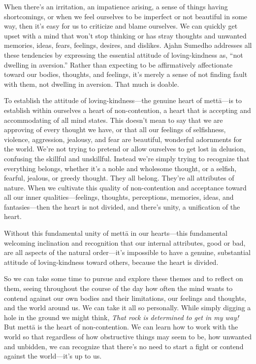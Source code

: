When there's an irritation, an impatience arising, a sense of things 
having shortcomings, or when we feel ourselves to be imperfect or not 
beautiful in some way, then it's easy for us to criticize and blame 
ourselves. We can quickly get upset with a mind that won't stop 
thinking or has stray thoughts and unwanted memories, ideas, fears, 
feelings, desires, and dislikes. Ajahn Sumedho addresses all these 
tendencies by expressing the essential attitude of loving-kindness as, 
``not dwelling in aversion.'' Rather than expecting to be affirmatively 
affectionate toward our bodies, thoughts, and feelings, it's merely a 
sense of not finding fault with them, not dwelling in aversion. That 
much is doable.

To establish the attitude of loving-kindness---the genuine heart of 
mettā---is to establish within ourselves a heart of non-contention, a 
heart that is accepting and accommodating of all mind states. This 
doesn't mean to say that we are approving of every thought we have, or 
that all our feelings of selfishness, violence, aggression, jealousy, 
and fear are beautiful, wonderful adornments for the world. We're not 
trying to pretend or allow ourselves to get lost in delusion, confusing 
the skillful and unskillful. Instead we're simply trying to recognize 
that everything belongs, whether it's a noble and wholesome thought, or 
a selfish, fearful, jealous, or greedy thought. They all belong. 
They're all attributes of nature. When we cultivate this quality of 
non-contention and acceptance toward all our inner 
qualities---feelings, thoughts, perceptions, memories, ideas, and 
fantasies---then the heart is not divided, and there's unity, a 
unification of the heart.

Without this fundamental unity of mettā in our hearts---this 
fundamental welcoming inclination and recognition that our internal 
attributes, good or bad, are all aspects of the natural order---it's 
impossible to have a genuine, substantial attitude of loving-kindness 
toward others, because the heart is divided.

So we can take some time to pursue and explore these themes and to 
reflect on them, seeing throughout the course of the day how often the 
mind wants to contend against our own bodies and their limitations, our 
feelings and thoughts, and the world around us. We can take it all so 
personally. While simply digging a hole in the ground we might think, 
\emph{That rock is determined to get in my way!} But mettā is the 
heart of non-contention. We can learn how to work with the world so 
that regardless of how obstructive things may seem to be, how unwanted 
and unbidden, we can recognize that there's no need to start a fight or 
contend against the world---it's up to us.

